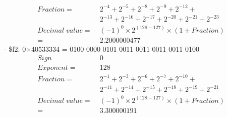 \documentclass[12pt,a4paper]{article}
\begin{document}
\begin{enumerate}
\begin{align*}
          Fraction       = & \;2^{-4} + 2^{-5} + 2^{-8} + 2^{-9} + 2^{-12}  +            \\
                           & \;2^{-13} + 2^{-16} + 2^{-17} + 2^{-20} + 2^{-21} + 2^{-23} \\
          Decimal\;value = & \;{(-1)}^{0} \times 2^{(128 - 127)} \times (1 + Fraction)   \\
          =                & \;2.2000000477
        \end{align*}
        - \$f2: 0\(\times\)40533334 = 0100 0000 0101 0011 0011 0011 0011 0100
        \begin{align*}
          Sign           = & \;0                                                          \\
          Exponent       = & \;128                                                        \\
          Fraction       = & \;2^{-1} + 2^{-3} + 2^{-6} + 2^{-7} + 2^{-10}  +             \\
                           & \;2^{-11} + 2^{-14} + 2^{-15}  + 2^{-18} + 2^{-19} + 2^{-21} \\
          Decimal\;value = & \;{(-1)}^{0} \times 2^{(128 - 127)} \times (1 + Fraction)    \\
          =                & \;3.300000191
        \end{align*}
\end{enumerate}


\end{document}
